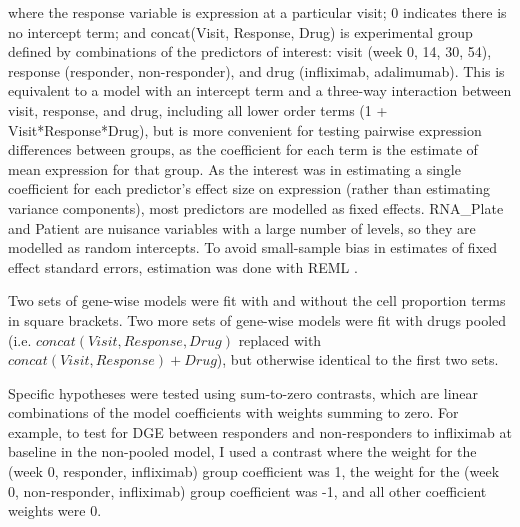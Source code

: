 where the response variable is expression at a particular visit;
0 indicates there is no intercept term;
and concat(Visit, Response, Drug) is experimental group defined by combinations of the predictors of interest:
    visit (week 0, 14, 30, 54), 
    response (responder, non-responder), 
    and drug (infliximab, adalimumab).
This is equivalent to a model with an intercept term and a three-way interaction between visit, response, and drug,
including all lower order terms (1 + Visit*Response*Drug),
but is more convenient for testing pairwise expression differences between groups,
as the coefficient for each term is the estimate of mean expression for that group.
As the interest was in estimating a single coefficient for each predictor's effect size on expression (rather than estimating variance components), 
most predictors are modelled as fixed effects.
RNA\_Plate and Patient are nuisance variables with a large number of levels, so they are modelled as random intercepts.
%
To avoid small-sample bias in estimates of fixed effect standard errors, estimation was done with \gls{REML} \autocite{mcneish2017SmallSampleMethods}.

Two sets of gene-wise models were fit with and without the cell proportion terms in square brackets.
Two more sets of gene-wise models were fit with drugs pooled (i.e. $concat(Visit, Response, Drug)$ replaced with $concat(Visit, Response) + Drug$),
but otherwise identical to the first two sets.

Specific hypotheses were tested using sum-to-zero contrasts, which are linear combinations of the model coefficients with weights summing to zero.
For example, to test for \gls{DGE} between responders and non-responders to infliximab at baseline in the non-pooled model,
I used a contrast where
the weight for the (week 0, responder, infliximab) group coefficient was 1,
the weight for the (week 0, non-responder, infliximab) group coefficient was -1,
and all other coefficient weights were 0.

